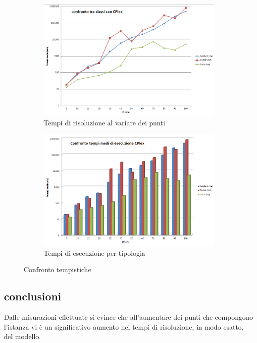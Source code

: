 \begin{figure}
\centering
\begin{subfigure}[b]{0.9\textwidth}
\includegraphics[width=\textwidth]{Images/Part_1/graphics/Times01.png}
\caption{Tempi di risoluzione al variare dei punti}
\label{pt1:time:time01}
\end{subfigure}

\begin{subfigure}[b]{0.9\textwidth}
\includegraphics[width=\textwidth]{Images/Part_1/graphics/Times02.png}
\caption{Tempi di esecuzione per tipologia}
\label{pt1:time:time02}
\end{subfigure}
\caption{Confronto tempistiche}
\label{pt1:time:times}
\end{figure}

\subsection[Conclusioni]{conclusioni}
\label{pt1:time:conclusion}
Dalle misurazioni effettuate si evince che all'aumentare dei punti che compongono l'istanza vi è un significativo aumento nei tempi di risoluzione, in modo esatto, del modello.

